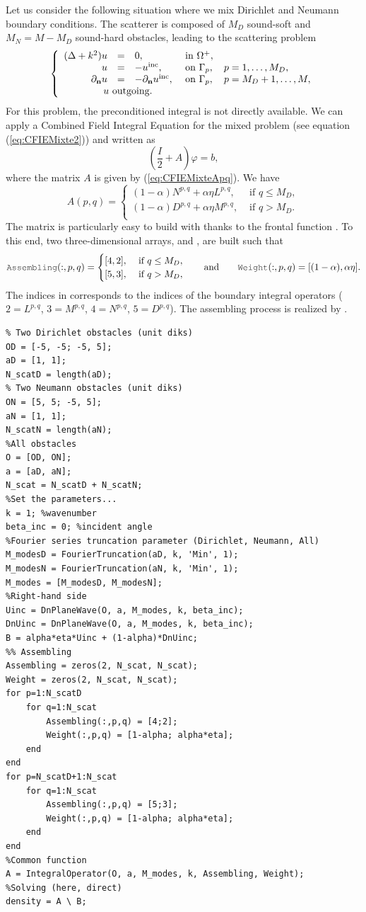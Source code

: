 Let us consider the following situation where we mix Dirichlet and Neumann boundary conditions. The scatterer is composed of
 $M_D$ sound-soft and  $M_N = M-M_D$ sound-hard obstacles, leading to the scattering problem
$$
\left\{\begin{array}{r c l l}
(\Delta +k^2)u & = & 0, & \text{ in }\Omegaps,\\
u & = & -\uinc, & \text{ on }\Gamma_p,\quad p=1,\ldots, M_D,\\
\dn u & = & -\dn \uinc, & \text{ on }\Gamma_p,\quad p=M_D+1,\ldots, M,\\
\multicolumn{4}{l}{\qquad \qquad u \text{ outgoing}.}
\end{array}\right.
$$
For this problem, the  preconditioned integral is not directly available. We can apply a Combined Field Integral Equation for the mixed problem
 (see equation (\ref{eq:CFIEMixte2})) and written as $$(\frac{I}{2} +A)\varphi = b,$$ where
  the matrix $A$ is
  given by  (\ref{eq:CFIEMixteApq}). We have
$$
A(p,q) = 
\begin{cases}
(1-\alpha) N^{p,q} + \alpha\eta L^{p,q}, & \text{ if } q \leq M_D,\\
(1-\alpha) D^{p,q} + \alpha\eta M^{p,q}, & \text{ if } q > M_D.\\
\end{cases}
$$
The  matrix is particularly easy to build  with \mudiff thanks to the frontal function \IntegralOperator. To this end, two
 three-dimensional arrays,  and , are built such that
$$
\code{Assembling}(:, p,q) = 
\begin{cases}
[4,2], & \text{ if } q \leq M_D,\\
[5,3], & \text{ if } q > M_D,
\end{cases}\qquad\text{and}\qquad
\code{Weight}(:, p,q) = [(1-\alpha), \alpha\eta].
$$
The indices in  corresponds to the indices of the boundary integral operators ($2=L^{p,q}$, $3=M^{p,q}$, $4=N^{p,q}$, $5=D^{p,q}$). The assembling process is realized by \IntegralOperator.
\begin{lstlisting}
% Two Dirichlet obstacles (unit diks)
OD = [-5, -5; -5, 5];
aD = [1, 1];
N_scatD = length(aD);
% Two Neumann obstacles (unit diks)
ON = [5, 5; -5, 5];
aN = [1, 1];
N_scatN = length(aN);
%All obstacles
O = [OD, ON];
a = [aD, aN];
N_scat = N_scatD + N_scatN;
%Set the parameters...
k = 1; %wavenumber
beta_inc = 0; %incident angle
%Fourier series truncation parameter (Dirichlet, Neumann, All)
M_modesD = FourierTruncation(aD, k, 'Min', 1);
M_modesN = FourierTruncation(aN, k, 'Min', 1);
M_modes = [M_modesD, M_modesN];
%Right-hand side
Uinc = DnPlaneWave(O, a, M_modes, k, beta_inc);
DnUinc = DnPlaneWave(O, a, M_modes, k, beta_inc);
B = alpha*eta*Uinc + (1-alpha)*DnUinc;
%% Assembling
Assembling = zeros(2, N_scat, N_scat);
Weight = zeros(2, N_scat, N_scat);
for p=1:N_scatD
	for q=1:N_scat
		Assembling(:,p,q) = [4;2];
		Weight(:,p,q) = [1-alpha; alpha*eta];
	end
end
for p=N_scatD+1:N_scat
	for q=1:N_scat
		Assembling(:,p,q) = [5;3];
		Weight(:,p,q) = [1-alpha; alpha*eta];
	end
end
%Common function
A = IntegralOperator(O, a, M_modes, k, Assembling, Weight);
%Solving (here, direct)
density = A \ B;
\end{lstlisting}
\medskip

